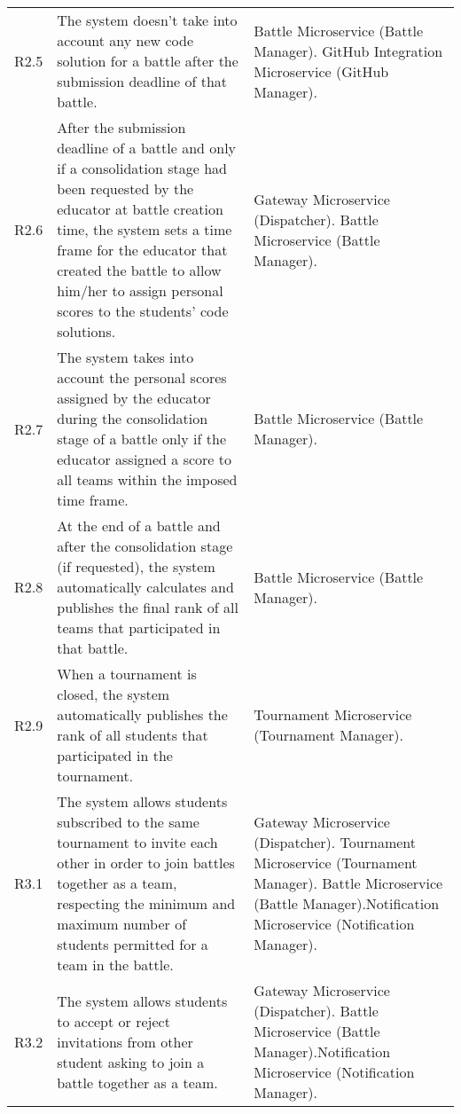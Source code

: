 \begin{longtable}{p{1cm} p{5.5cm} p{6cm}}
 	R2.5 & The system doesn’t take into account any new code solution for a battle after the submission deadline of that battle. & Battle Microservice (Battle Manager). \newline GitHub Integration Microservice (GitHub Manager).\\
 	
 	R2.6 & After the submission deadline of a battle and only if a consolidation stage had been requested	by the educator at battle creation time, the system sets a time frame for the educator that created the battle to allow him/her to assign personal scores to the students’ code solutions. & Gateway Microservice (Dispatcher). \newline Battle Microservice (Battle Manager).\\
 	
 	R2.7 & The system takes into account the personal scores assigned by the educator during the	consolidation stage of a battle only if the educator assigned a score to all teams within the imposed time frame. & Battle Microservice (Battle Manager).\\
 	
 	R2.8 & At the end of a battle and after the consolidation stage (if requested), the system automatically calculates and publishes the final rank of all teams that participated in that battle. & Battle Microservice (Battle Manager).\\
 	
 	R2.9 & When a tournament is closed, the system automatically publishes the rank of all students that participated in the tournament. & Tournament Microservice (Tournament Manager).\\
 	
 	R3.1 & The system allows students subscribed to the same tournament to invite each other in order to join battles together as a team, respecting the minimum and maximum number of students permitted for a team in the battle. & Gateway Microservice (Dispatcher). \newline Tournament Microservice (Tournament Manager). \newline Battle Microservice (Battle Manager).\newline Notification Microservice (Notification Manager).\\
 	
 	R3.2 & The system allows students to accept or reject invitations from other student asking to join a battle together as a team. & Gateway Microservice (Dispatcher). \newline Battle Microservice (Battle Manager).\newline Notification Microservice (Notification Manager).\\
 	

\end{longtable}
